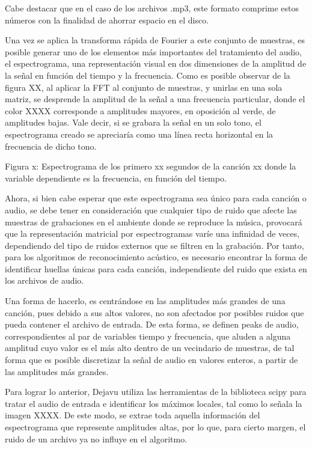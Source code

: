 Cabe destacar que en el caso de los archivos .mp3, este formato comprime estos números con la finalidad de ahorrar espacio en el disco.

\bigskip

Una vez se aplica la transforma rápida de Fourier a este conjunto de muestras, es posible generar uno de los elementos más importantes del tratamiento del audio, el espectrograma, una representación visual en dos dimensiones de la amplitud de la señal en función del tiempo y la frecuencia. Como es posible observar de la figura XX, al aplicar la FFT al conjunto de muestras, y unirlas en una sola matriz, se desprende la amplitud de la señal a una frecuencia particular, donde el color XXXX corresponde a amplitudes mayores, en oposición al verde, de amplitudes bajas. Vale decir, si se grabara la señal en un solo tono, el espectrograma creado se apreciaría como una línea recta horizontal en la frecuencia de dicho tono.

\bigskip
[]
Figura x: Espectrograma de los primero xx segundos de la canción xx donde la variable dependiente es la frecuencia, en función del tiempo.
\bigskip

Ahora, si bien cabe esperar que este espectrograma sea único para cada canción o audio, se debe tener en consideración que cualquier tipo de ruido que afecte las muestras de grabaciones en el ambiente donde se reproduce la música, provocará que la representación matricial por espectrogramas varíe una infinidad de veces, dependiendo del tipo de ruidos externos que se filtren en la grabación. Por tanto, para los algoritmos de reconocimiento acústico, es necesario encontrar la forma de identificar huellas únicas para cada canción, independiente del ruido que exista en los archivos de audio.

\bigskip

Una forma de hacerlo, es centrándose en las amplitudes más grandes de una canción, pues debido a sus altos valores, no son afectados por posibles ruidos que pueda contener el archivo de entrada. De esta forma, se definen peaks de audio, correspondientes al par de variables tiempo y frecuencia, que aluden a alguna amplitud cuyo valor es el más alto dentro de un vecindario de muestras, de tal forma que es posible discretizar la señal de audio en valores enteros, a partir de las amplitudes más grandes.

\bigskip

Para lograr lo anterior, Dejavu utiliza las herramientas de la biblioteca scipy para tratar el audio de entrada e identificar los máximos locales, tal como lo señala la imagen XXXX. De este modo, se extrae toda aquella información del espectrograma que represente amplitudes altas, por lo que, para cierto margen, el ruido de un archivo ya no influye en el algoritmo.


